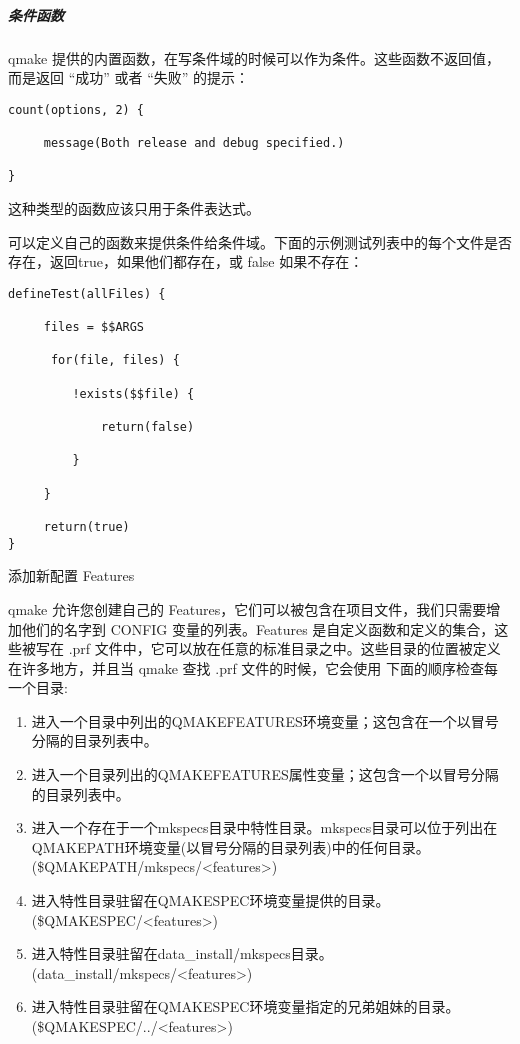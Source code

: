 \subparagraph{条件函数}\label{ux6761ux4ef6ux51fdux6570}

qmake
提供的内置函数，在写条件域的时候可以作为条件。这些函数不返回值，而是返回
``成功'' 或者 ``失败'' 的提示：

\begin{verbatim}
count(options, 2) {

     message(Both release and debug specified.)

}
\end{verbatim}

这种类型的函数应该只用于条件表达式。

可以定义自己的函数来提供条件给条件域。下面的示例测试列表中的每个文件是否存在，返回true，如果他们都存在，或
false 如果不存在：

\begin{verbatim}
defineTest(allFiles) {

     files = $$ARGS

      for(file, files) {

         !exists($$file) {

             return(false)

         }

     }

     return(true)
}
\end{verbatim}

添加新配置 Features

qmake 允许您创建自己的
Features，它们可以被包含在项目文件，我们只需要增加他们的名字到 CONFIG
变量的列表。Features 是自定义函数和定义的集合，这些被写在 .prf
文件中，它可以放在任意的标准目录之中。这些目录的位置被定义在许多地方，并且当
qmake 查找 .prf 文件的时候，它会使用 下面的顺序检查每一个目录:

\begin{enumerate}

\item
  进入一个目录中列出的QMAKEFEATURES环境变量；这包含在一个以冒号分隔的目录列表中。
\item
  进入一个目录列出的QMAKEFEATURES属性变量；这包含一个以冒号分隔的目录列表中。
\item
  进入一个存在于一个mkspecs目录中特性目录。mkspecs目录可以位于列出在QMAKEPATH环境变量(以冒号分隔的目录列表)中的任何目录。(\$QMAKEPATH/mkspecs/\textless{}features\textgreater{})
\item
  进入特性目录驻留在QMAKESPEC环境变量提供的目录。
  (\$QMAKESPEC/\textless{}features\textgreater{})
\item
  进入特性目录驻留在data\_install/mkspecs目录。(data\_install/mkspecs/\textless{}features\textgreater{})
\item
  进入特性目录驻留在QMAKESPEC环境变量指定的兄弟姐妹的目录。(\$QMAKESPEC/../\textless{}features\textgreater{})
\end{enumerate}

